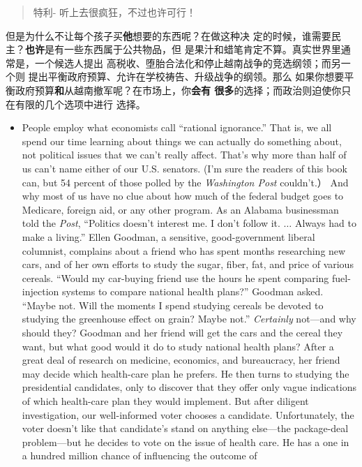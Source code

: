 \begin{paracol}{2}
\begin{itemize}
\begin{quotation}
		特利- 听上去很疯狂，不过也许可行！
	\end{quotation}
	但是为什么不让每个孩子买\textbf{他}想要的东西呢？在做这种决
	定的时候，谁需要民主？\textbf{也许}是有一些东西属于公共物品，但
	是果汁和蜡笔肯定不算。真实世界里通常是，一个候选人提出
	高税收、堕胎合法化和停止越南战争的竞选纲领；而另一个则
	提出平衡政府预算、允许在学校祷告、升级战争的纲领。那么
	如果你想要平衡政府预算\textbf{和}从越南撤军呢？在市场上，你\textbf{会有
	很多}的选择；而政治则迫使你只在有限的几个选项中进行
	选择。
\end{itemize}
\switchcolumn*
\begin{itemize}
	\item People employ what economists call ``rational ignorance.''
	That is, we all spend our time learning about things we can actually do something about, not political issues that we can't really affect. That's why more than half of us can't name either of
	our U.S. senators. (I'm sure the readers of this book can, but 54
	percent of those polled by the \textit{Washington Post} couldn't.） And
	why most of us have no clue about how much of the federal
	budget goes to Medicare, foreign aid, or any other program. As
	an Alabama businessman told the \textit{Post}, ``Politics doesn't interest
	me. I don't follow it. $\ldots$ Always had to make a living.'' Ellen
	Goodman, a sensitive, good-government liberal columnist,
	complains about a friend who has spent months researching
	new cars, and of her own efforts to study the sugar, fiber, fat,
	and price of various cereals. ``Would my car-buying friend use
	the hours he spent comparing fuel-injection systems to compare
	national health plans?'' Goodman asked. ``Maybe not. Will the
	moments I spend studying cereals be devoted to studying the
	greenhouse effect on grain? Maybe not.'' \textit{Certainly} not---and
	why should they? Goodman and her friend will get the cars and
	the cereal they want, but what good would it do to study national health plans? After a great deal of research on medicine,
	economics, and bureaucracy, her friend may decide which
	health-care plan he prefers. He then turns to studying the presidential candidates, only to discover that they offer only vague
	indications of which health-care plan they would implement. But after diligent investigation, our well-informed voter
	chooses a candidate. Unfortunately, the voter doesn't like that
	candidate's stand on anything else---the package-deal problem---but he decides to vote on the issue of health care. He has
	a one in a hundred million chance of influencing the outcome of

\end{itemize}
\end{paracol}

